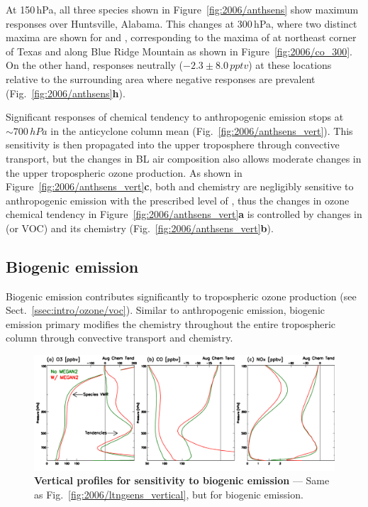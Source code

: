 At 150\,\unit{hPa}, all three species shown in Figure~\ref{fig:2006/anthsens} show maximum responses over Huntsville,
Alabama. This changes at 300\,\unit{hPa}, where two distinct maxima are shown for  and ,
corresponding to the maxima of  at northeast corner of Texas and along Blue Ridge Mountain as shown in
Figure~\ref{fig:2006/co_300}. On the other hand,  responses neutrally ($-2.3\pm8.0\,\unit{pptv}$) at
these locations relative to the surrounding area where negative responses are prevalent (Fig.~\ref{fig:2006/anthsens}{\bf h}).

Significant responses of chemical tendency to anthropogenic emission stops at $\sim700\,\unit{hPa}$ in the anticyclone
column mean (Fig.~\ref{fig:2006/anthsens_vert}). This sensitivity is then propagated into the upper troposphere through
convective transport, but the changes in BL air composition also allows moderate changes in the upper tropospheric
ozone production. As shown in Figure~\ref{fig:2006/anthsens_vert}{\bf c}, both  and  chemistry
are negligibly sensitive to anthropogenic emission with the prescribed level of {\lnox}, thus the changes in ozone chemical
tendency in Figure~\ref{fig:2006/anthsens_vert}{\bf a} is controlled by changes in  (or VOC) and its chemistry
(Fig.~\ref{fig:2006/anthsens_vert}{\bf b}).

\subsection{Biogenic emission}\label{ssec:2006/sens/bio}

Biogenic emission contributes significantly to tropospheric ozone production (see Sect.~\ref{ssec:intro/ozone/voc}).
Similar to anthropogenic emission, biogenic emission primary modifies the chemistry throughout the entire tropospheric
column through convective transport and chemistry.

	\begin{figure}[t!]
		\centering
		\includegraphics[width=1.0\textwidth]{sens/biosens_vert}
		\caption[Vertical profiles for sensitivity to biogenic emission]{\textbf{Vertical profiles for sensitivity to
		biogenic emission} --- Same as Fig.~\ref{fig:2006/ltngsens_vertical}, but for biogenic emission.
		\label{fig:2006/biosens_vert} }\vspace{-.3in}
	\end{figure}

